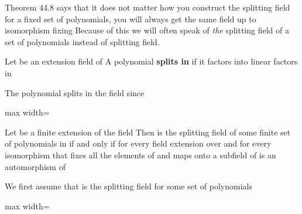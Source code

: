 \documentclass[11pt,oneside]{article}
\begin{document}
\begin{BookBody}

Theorem 44.8 says that it does not matter how you construct the splitting field for a fixed set of polynomials, you will always get the same field up to isomorphism fixing  Because of this we will often speak of\textit{ the} splitting field of a set of polynomials instead of  splitting field.

 Let  be an extension field of  A polynomial  \textbf{splits in}  if it factors into linear factors in \BookEnd{\blacksquare}

 The polynomial  splits in the field  since

\begin{center}\begin{adjustbox}{max width=\linewidth}\end{adjustbox}\end{center} \BookEnd{\blacktriangle}

 Let  be a finite extension of the field  Then  is the splitting field of some finite set of polynomials in  if and only if for every field extension  over  and for every isomorphism \BookInline{\sigma } that fixes all the elements of  and maps  onto a subfield of  is an automorphism of 

 We first assume that  is the splitting field for some set of polynomials

\begin{center}\begin{adjustbox}{max width=\linewidth}\end{adjustbox}\end{center}


\end{BookBody}
\end{document}
